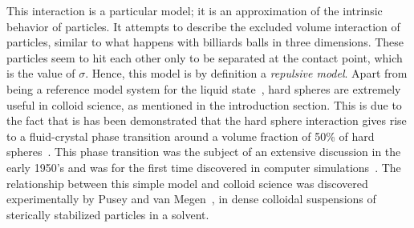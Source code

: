 This interaction is a particular model; it is an approximation of the intrinsic
behavior of particles.
It attempts to describe the excluded volume interaction of particles, similar to what
happens with billiards balls in three dimensions.
These particles seem to hit each other only to be separated at the contact point, which
is the value of $\sigma$. Hence, this model is by definition a \emph{repulsive model}.
Apart from being a reference model system for the liquid
state~\cite{hansenTheorySimpleLiquids2013}, hard spheres are extremely useful in
colloid science, as mentioned in the introduction section. This is due to the fact
that is has been demonstrated that the hard sphere interaction gives rise to a
fluid-crystal phase transition around a volume fraction of 50\% of hard 
spheres~\cite{hooverMeltingTransitionCommunal1968a,gastSimpleOrderingComplex1998,roblesNoteEquationState2014a}.
This phase transition was the subject of an extensive discussion in the early
1950's and was for the first time discovered in computer
simulations~\cite{alderPhaseTransitionHard1957a}.
The relationship between this simple model and colloid science was discovered
experimentally by Pusey and van Megen~\cite{puseyPhaseBehaviourConcentrated1986},
in dense colloidal suspensions of sterically stabilized particles in a solvent.

